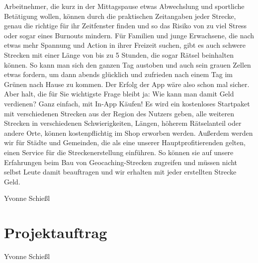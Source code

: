 \documentclass[a4paper, 12pt]{article}
\begin{document}
Arbeitnehmer, die kurz in der Mittagspause etwas Abwechslung und sportliche Betätigung wollen, können durch die praktischen Zeitangaben jeder Strecke, genau die richtige für ihr Zeitfenster finden und so das Risiko von zu viel Stress oder sogar eines Burnouts mindern.\newline
Für Familien und junge Erwachsene, die nach etwas mehr Spannung und Action in ihrer Freizeit suchen, gibt es auch schwere Strecken mit einer Länge von bis zu 5 Stunden, die sogar Rätsel beinhalten können. So kann man sich den ganzen Tag austoben und auch sein grauen Zellen etwas fordern, um dann abends glücklich und zufrieden nach einem Tag im Grünen nach Hause zu kommen.\newline
Der Erfolg der App wäre also schon mal sicher. Aber halt, die für Sie wichtigste Frage bleibt ja: Wie kann man damit Geld verdienen? Ganz einfach, mit In-App Käufen!\newline
Es wird ein kostenloses Startpaket mit verschiedenen Strecken aus der Region des Nutzers geben, alle weiteren Strecken in verschiedenen Schwierigkeiten, Längen, höherem Rätselanteil oder andere Orte, können kostenpflichtig im Shop erworben werden. Außerdem werden wir für Städte und Gemeinden, die als eine unserer Hauptprofitierenden gelten, einen Service für die Streckenerstellung einführen. So können sie auf unsere Erfahrungen beim Bau von Geocaching-Strecken zugreifen und müssen nicht selbst Leute damit beauftragen und wir erhalten mit jeder erstellten Strecke Geld.

Yvonne Schießl

\section{Projektauftrag}
\begin{figure}[H] 
	\begin{minipage}{17cm} 
	\end{minipage}
\end{figure}

\begin{figure}[H] 
	\begin{minipage}{17cm} 
	\end{minipage}
\end{figure}

Yvonne Schießl
\end{document}
